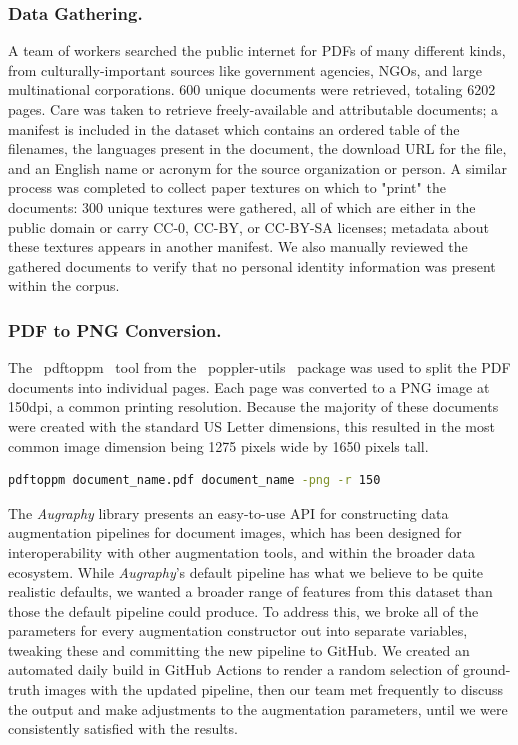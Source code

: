 \documentclass[runningheads]{llncs}
\begin{document}
\subsubsection{Data Gathering.}
A team of workers searched the public internet for PDFs of many different kinds, from culturally-important sources like government agencies, NGOs, and large multinational corporations.
600 unique documents were retrieved, totaling 6202 pages.
Care was taken to retrieve freely-available and attributable documents; a manifest is included in the dataset which contains an ordered table of the filenames, the languages present in the document, the download URL for the file, and an English name or acronym for the source organization or person.
A similar process was completed to collect paper textures on which to "print" the documents: 300 unique textures were gathered, all of which are either in the public domain or carry CC-0, CC-BY, or CC-BY-SA licenses; metadata about these textures appears in another manifest.
We also manually reviewed the gathered documents to verify that no personal identity information was present within the corpus.

\subsubsection{PDF to PNG Conversion.}
The ~pdftoppm~ tool from the ~poppler-utils~ package was used to split the PDF documents into individual pages.
Each page was converted to a PNG image at 150dpi, a common printing resolution.
Because the majority of these documents were created with the standard US Letter dimensions, this resulted in the most common image dimension being 1275 pixels wide by 1650 pixels tall.

\begin{lstlisting}[language=bash]
  pdftoppm document_name.pdf document_name -png -r 150
\end{lstlisting}

The \emph{Augraphy} library presents an easy-to-use API for constructing data augmentation pipelines for document images, which has been designed for interoperability with other augmentation tools, and within the broader data ecosystem.
While \emph{Augraphy}'s default pipeline has what we believe to be quite realistic defaults, we wanted a broader range of features from this dataset than those the default pipeline could produce.
To address this, we broke all of the parameters for every augmentation constructor out into separate variables, tweaking these and committing the new pipeline to GitHub.
We created an automated daily build in GitHub Actions to render a random selection of ground-truth images with the updated pipeline, then our team met frequently to discuss the output and make adjustments to the augmentation parameters, until we were consistently satisfied with the results.
\end{document}
